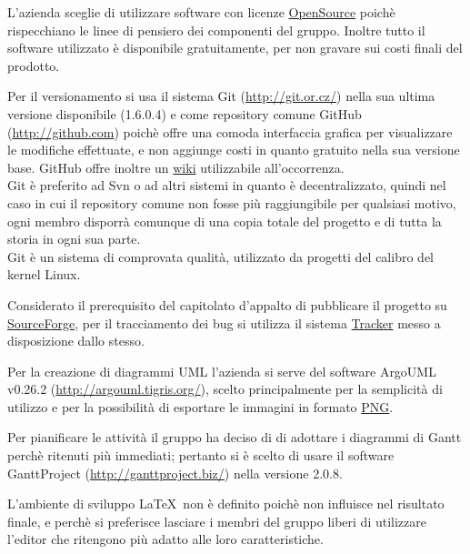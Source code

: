 L'azienda sceglie di utilizzare software con licenze \underline{OpenSource} poich\`e rispecchiano le linee di pensiero dei componenti del gruppo. Inoltre tutto il software utilizzato \`e disponibile gratuitamente, per non gravare sui costi finali del prodotto.

Per il versionamento si usa il sistema Git (\href{http://git.or.cz/}{http://git.or.cz/}) nella sua ultima versione disponibile (1.6.0.4) e come repository comune GitHub (\href{http://github.com}{http://github.com}) poich\`e offre una comoda interfaccia grafica per visualizzare le modifiche effettuate, e non aggiunge costi in quanto gratuito nella sua versione base. GitHub offre inoltre un \underline{wiki} utilizzabile all'occorrenza.\\
Git \`e preferito ad Svn o ad altri sistemi in quanto \`e decentralizzato, quindi nel caso in cui il repository comune non fosse pi\`u raggiungibile per qualsiasi motivo, ogni membro disporr\`a comunque di una copia totale del progetto e di tutta la storia in ogni sua parte.\\
Git \`e un sistema di comprovata qualit\`a, utilizzato da progetti del calibro del kernel Linux.

Considerato il prerequisito del capitolato d'appalto di pubblicare il progetto su \href{http://sourceforge.net}{SourceForge}, per il tracciamento dei bug si utilizza il sistema \href{https://sourceforge.net/tracker/?group_id=245619}{Tracker} messo a disposizione dallo stesso.

Per la creazione di diagrammi UML l'azienda si serve del software ArgoUML v0.26.2 (\href{http://argouml.tigris.org/}{http://argouml.tigris.org/}), scelto principalmente per la semplicit\`a di utilizzo e per la possibilit\`a di esportare le immagini in formato \underline{PNG}.

Per pianificare le attivit\`a il gruppo ha deciso di di adottare i diagrammi di Gantt perch\`e ritenuti pi\`u immediati; pertanto si \`e scelto di usare il software GanttProject (\href{http://ganttproject.biz/}{http://ganttproject.biz/}) nella versione 2.0.8.

L'ambiente di sviluppo \LaTeX \ non \`e definito poich\`e non influisce nel risultato finale, e perch\`e si preferisce lasciare i membri del gruppo liberi di utilizzare l'editor che ritengono pi\`u adatto alle loro caratteristiche.


